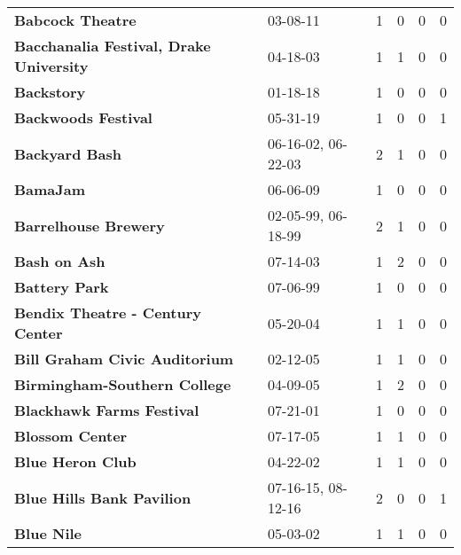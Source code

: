 \begin{supertabular}{p{0.4\textwidth}p{0.3\textwidth}p{0.05\textwidth}p{0.05\textwidth}p{0.05\textwidth}p{0.05\textwidth}}
                                             \textbf{Babcock Theatre} &            03-08-11 &  1 &  0 &  0 &  0 \\
                      \textbf{Bacchanalia Festival, Drake University} &            04-18-03 &  1 &  1 &  0 &  0 \\
                                                   \textbf{Backstory} &            01-18-18 &  1 &  0 &  0 &  0 \\
                                          \textbf{Backwoods Festival} &            05-31-19 &  1 &  0 &  0 &  1 \\
                                               \textbf{Backyard Bash} &  06-16-02, 06-22-03 &  2 &  1 &  0 &  0 \\
                                                     \textbf{BamaJam} &            06-06-09 &  1 &  0 &  0 &  0 \\
                                         \textbf{Barrelhouse Brewery} &  02-05-99, 06-18-99 &  2 &  1 &  0 &  0 \\
                                                 \textbf{Bash on Ash} &            07-14-03 &  1 &  2 &  0 &  0 \\
                                                \textbf{Battery Park} &            07-06-99 &  1 &  0 &  0 &  0 \\
                             \textbf{Bendix Theatre - Century Center} &            05-20-04 &  1 &  1 &  0 &  0 \\
                                \textbf{Bill Graham Civic Auditorium} &            02-12-05 &  1 &  1 &  0 &  0 \\
                                 \textbf{Birmingham-Southern College} &            04-09-05 &  1 &  2 &  0 &  0 \\
                                    \textbf{Blackhawk Farms Festival} &            07-21-01 &  1 &  0 &  0 &  0 \\
                                              \textbf{Blossom Center} &            07-17-05 &  1 &  1 &  0 &  0 \\
                                             \textbf{Blue Heron Club} &            04-22-02 &  1 &  1 &  0 &  0 \\
                                    \textbf{Blue Hills Bank Pavilion} &  07-16-15, 08-12-16 &  2 &  0 &  0 &  1 \\
                                                   \textbf{Blue Nile} &            05-03-02 &  1 &  1 &  0 &  0 \\

\end{supertabular}
